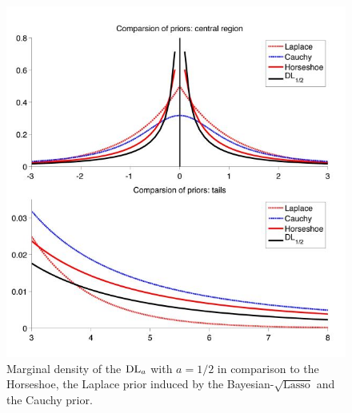 \documentclass[chapters]{uamaththesis}
\begin{document}
\begin{figure}[ht]
\centering
\includegraphics[scale=.6]{Priors}
\caption{Marginal density of the $\text{\rm{DL}}_a$ with $a = 1/2$ in comparison to the Horseshoe, the Laplace prior induced by the Bayesian-$\sqrt{\text{Lasso}}$ and the Cauchy prior.}
\label{fig_priors}
\end{figure}
\end{document}

